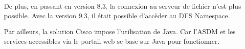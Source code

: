 De plus, en passant en version 8.3, la connexion au serveur de fichier n'est plus possible.
Avec la version 9.3, il était possible d'accèder au DFS Namespace.

Par ailleurs, la solution Cisco impose l'utilisation de Java.
Car l'ASDM et les services accessibles via le portail web se base sur Java pour fonctionner.


